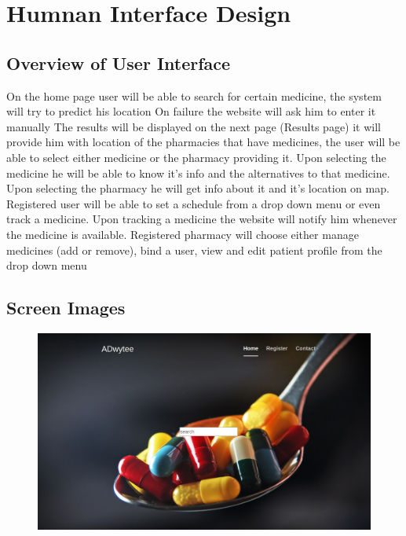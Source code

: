 \documentclass[]{article}
\begin{document}
\section{Humnan Interface Design}

\subsection {Overview of User Interface}
On the home page user will be able to search for certain medicine, the system will try to predict his location
\newline
On failure the website will ask him to enter it manually
\newline
The results will be displayed on the next page (Results page) it will provide him with location of the pharmacies that have medicines, the user will be able to select either medicine or the pharmacy providing it.
\newline
Upon selecting the medicine he will be able to know it's info and the alternatives to that medicine.
\newline
Upon selecting the pharmacy he will get info about it and it's location on map.
\newline
\newline
Registered user will be able to set a schedule from a drop down menu or even track a medicine.
\newline
Upon tracking a medicine the website will notify him whenever the medicine is available.
\newline
\newline
Registered pharmacy will choose either manage medicines (add or remove), bind a user, view and edit patient profile from the drop down menu
\newline

\subsection {Screen Images}

\begin{figure}[H]
\centering
\includegraphics[scale=0.18]{./Home}
\end{figure}
\end{document}
